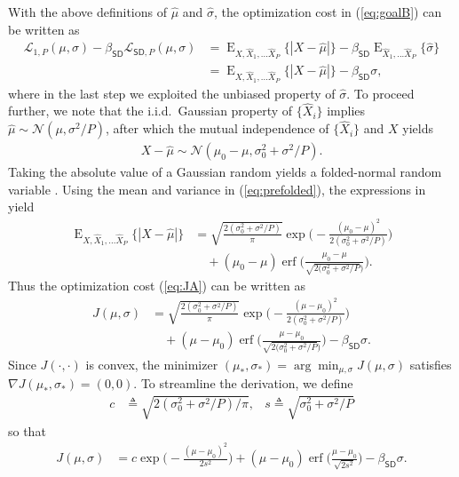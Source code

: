 \documentclass{article}
\theoremstyle{plain}
\theoremstyle{definition}
\theoremstyle{remark}
\renewcommand{\hat}{\widehat}
\newcommand{\defn}{\triangleq}
\newcommand{\mc}[1]{\ensuremath{\mathcal{#1}}}
\DeclareMathOperator{\E}{E}
\DeclareMathOperator{\erf}{erf}
\renewcommand{\eqref}[1]{(\ref{eq:#1})}
\newcommand{\ExxP}{\E_{X,\hat{X}_1,...\hat{X}_P}}
\newcommand{\ExP}{\E_{\hat{X}_1,...\hat{X}_P}}
\newcommand{\LoneP}{\mc{L}_{1,P}}
\newcommand{\LstdP}{\mc{L}_{\mathsf{SD},P}}
\newcommand{\betastd}{\beta_{\mathsf{SD}}}
\begin{document}
With the above definitions of $\hat{\mu}$ and $\hat{\sigma}$, the optimization cost in \eqref{goalB} can be written as
\begin{align}
\LoneP(\mu,\sigma) - \betastd \LstdP(\mu,\sigma)
&= \ExxP\big\{|X-\hat{\mu}|\big\} - \betastd\ExP\big\{\hat{\sigma}\big\} \\
&= \ExxP\big\{|X-\hat{\mu}|\big\} - \betastd\sigma 
\label{eq:JA},
\end{align}
where in the last step we exploited the unbiased property of $\hat{\sigma}$. %
To proceed further, we note that the i.i.d.\ Gaussian property of $\{\hat{X}_i\}$ implies $\hat{\mu}\sim\mc{N}(\mu,\sigma^2/P)$, after which the mutual independence of $\{\hat{X}_i\}$ and $X$ yields
\begin{align}
X-\hat{\mu}
\sim \mc{N}(\mu_0-\mu,\sigma_0^2 + \sigma^2/P) 
\label{eq:prefolded}.
\end{align}
Taking the absolute value of a Gaussian random yields a folded-normal random variable \cite{Leone:Techno:61}.
Using the mean and variance in \eqref{prefolded}, the expressions in \cite{Leone:Techno:61} yield
\begin{align}
\ExxP\big\{ |X-\hat{\mu}| \big\} 
&= \sqrt{\frac{2(\sigma_0^2+\sigma^2/P)}{\pi}}
    \exp\Big(-\frac{(\mu_0 - \mu)^2}{2(\sigma_0^2+\sigma^2/P)}\Big)
\nonumber\\&\quad
   + (\mu_0 - \mu)\erf\Big(\frac{\mu_0 - \mu}{\sqrt{2(\sigma_0^2 + \sigma^2/P})}\Big) .
\end{align}
Thus the optimization cost \eqref{JA} can be written as
\begin{align}
J(\mu,\sigma) 
&= \sqrt{\frac{2(\sigma_0^2+\sigma^2/P)}{\pi}}
    \exp\Big(-\frac{(\mu-\mu_0)^2}{2(\sigma_0^2+\sigma^2/P)}\Big)
\nonumber\\&\quad
    + (\mu-\mu_0)\erf\Big(\frac{\mu-\mu_0}{\sqrt{2(\sigma_0^2 + \sigma^2/P})}\Big)
   - \betastd \sigma 
\label{eq:JB}.
\end{align}
Since $J(\cdot,\cdot)$ is convex, the minimizer $(\mu_*,\sigma_*)=\arg\min_{\mu,\sigma} J(\mu,\sigma)$ satisfies $\nabla J(\mu_*,\sigma_*)=(0,0)$.
To streamline the derivation, we define
\begin{align}
c &\defn \sqrt{2(\sigma_0^2 + \sigma^2/P)/\pi},
&s \defn \sqrt{\sigma_0^2 + \sigma^2/P}
\end{align}
so that 
\begin{align}
J(\mu,\sigma)
&= c \exp\Big(-\frac{(\mu-\mu_0)^2}{2s^2}\Big)
   + (\mu-\mu_0)\erf\Big(\frac{\mu-\mu_0}{\sqrt{2s^2}}\Big)
   - \betastd \sigma .
\end{align}
\end{document}

